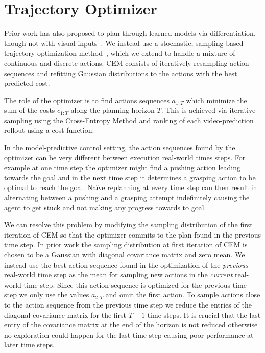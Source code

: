 \section{Trajectory Optimizer}
\label{sec:optimizer}

Prior work has also proposed to plan through learned models via differentiation, though not with visual inputs~\cite{deep_mpc}. We instead use a stochastic, sampling-based trajectory optimization method~\cite{kroese2013cross,foresight}, which we extend to handle a mixture of continuous and discrete actions. CEM consists of iteratively resampling action sequences and refitting Gaussian distributions to the actions with the best predicted cost. 

The role of the optimizer is to find actions sequences $a_{1:T}$ which minimize the sum of the costs $c_{1:T}$ along the planning horizon $T$. This is achieved via iterative sampling using the Cross-Entropy Method
and ranking of each video-prediction rollout using a cost function. 

In the model-predictive control setting, the action sequences found by the optimizer can be very different between execution real-world times steps. For example at one time step the optimizer might find a pushing action leading towards the goal and in the next time step it determines a grasping action to be optimal to reach the goal. Na\"{i}ve replanning at every time step can then result in alternating between a pushing and a grasping attempt indefinitely causing the agent to get stuck and not making any progress towards to goal. 

We can resolve this problem by modifying the sampling distribution of the first iteration of CEM so that the optimizer commits to the plan found in the previous time step. In prior work \cite{sna}
the sampling distribution at first iteration of CEM is chosen to be a Gaussian with diagonal covariance matrix and zero mean. We instead use the best action sequence found in the optimization of the \emph{previous} real-world time step as the mean for sampling new actions in the \emph{current} real-world time-step. Since this action sequence is optimized for the previous time step we only use the values $a_{2:T}$ and omit the first action. To sample actions close to the action sequence from the previous time step we reduce the entries of the diagonal covariance matrix for the first $T-1$ time steps. It is crucial that the last entry of the covariance matrix at the end of the horizon is not reduced otherwise no exploration could happen for the last time step causing poor performance at later time steps.